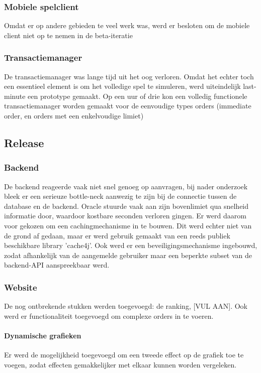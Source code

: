 \subsubsection{Mobiele spelclient}
Omdat er op andere gebieden te veel werk was, werd er besloten om de mobiele client niet op te nemen in de beta-iteratie

\subsubsection{Transactiemanager}
De transactiemanager was lange tijd uit het oog verloren. Omdat het echter toch een essentieel element is om het volledige spel te simuleren, werd uiteindelijk last-minute een prototype gemaakt. Op een uur of drie kon een volledig functionele transactiemanager worden gemaakt voor de eenvoudige types orders (immediate order, en orders met een enkelvoudige limiet)


\subsection{Release}

\subsubsection{Backend}
De backend reageerde vaak niet snel genoeg op aanvragen, bij nader onderzoek bleek er een serieuze bottle-neck aanwezig te zijn bij de connectie tussen de database en de backend. Oracle stuurde vaak aan zijn bovenlimiet qua snelheid informatie door, waardoor kostbare seconden verloren gingen. Er werd daarom voor gekozen om een cachingmechanisme in te bouwen. Dit werd echter niet van de grond af gedaan, maar er werd gebruik gemaakt van een reeds publiek beschikbare library 'cache4j'.
Ook werd er een beveiligingsmechanisme ingebouwd, zodat afhankelijk van de aangemelde gebruiker maar een beperkte subset van de backend-API aanspreekbaar werd.

\subsubsection{Website}
De nog ontbrekende stukken werden toegevoegd: de ranking, [VUL AAN]. Ook werd er functionaliteit toegevoegd om complexe orders in te voeren.
\paragraph{Dynamische grafieken}
Er werd de mogelijkheid toegevoegd om een tweede effect op de grafiek toe te voegen, zodat effecten gemakkelijker met elkaar kunnen worden vergeleken. 

